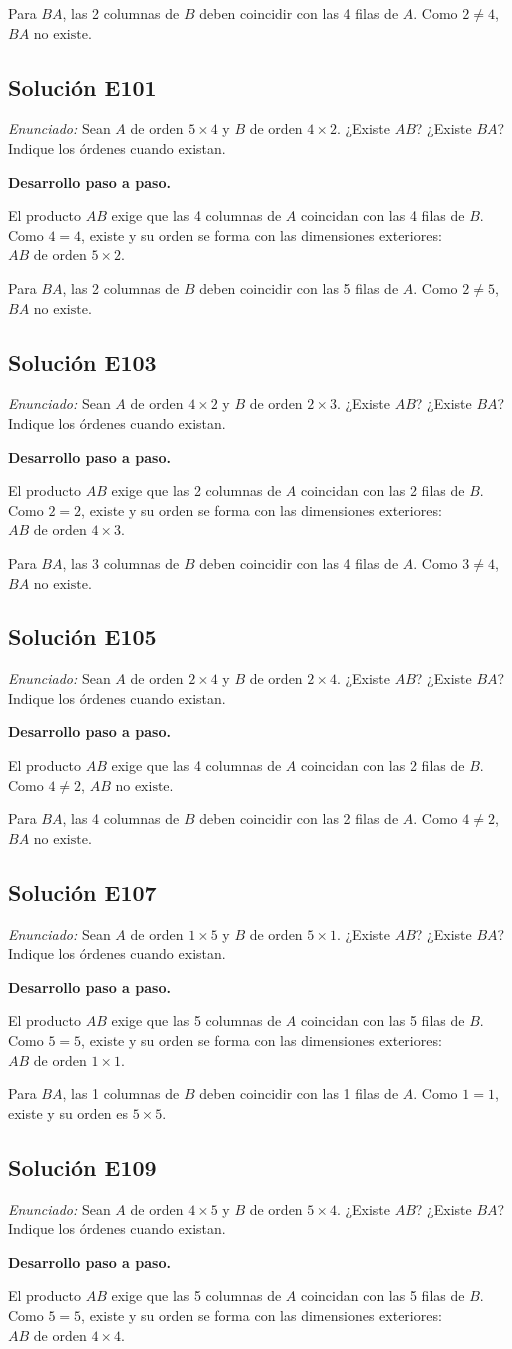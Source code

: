 \documentclass[12pt]{article}
\theoremstyle{remark}
\newcommand{\solucion}[2]{\Needspace{11\baselineskip}\subsection*{Solución E#1}\noindent\textit{Enunciado:} #2\par\medskip\noindent\textbf{Desarrollo paso a paso.}\par\medskip}
\begin{document}
Para $BA$, las 2 columnas de $B$ deben coincidir con las 4 filas de $A$. Como $2\neq4$, $\boxed{BA\text{ no existe}}$.


\medskip

\solucion{101}{Sean $A$ de orden $5\times4$ y $B$ de orden $4\times2$. ¿Existe $AB$? ¿Existe $BA$? Indique los órdenes cuando existan.}
El producto $AB$ exige que las 4 columnas de $A$ coincidan con las 4 filas de $B$. Como $4=4$, existe y su orden se forma con las dimensiones exteriores: $\boxed{AB\text{ de orden } 5\times 2}$.

Para $BA$, las 2 columnas de $B$ deben coincidir con las 5 filas de $A$. Como $2\neq5$, $\boxed{BA\text{ no existe}}$.


\medskip

\solucion{103}{Sean $A$ de orden $4\times2$ y $B$ de orden $2\times3$. ¿Existe $AB$? ¿Existe $BA$? Indique los órdenes cuando existan.}
El producto $AB$ exige que las 2 columnas de $A$ coincidan con las 2 filas de $B$. Como $2=2$, existe y su orden se forma con las dimensiones exteriores: $\boxed{AB\text{ de orden } 4\times 3}$.

Para $BA$, las 3 columnas de $B$ deben coincidir con las 4 filas de $A$. Como $3\neq4$, $\boxed{BA\text{ no existe}}$.


\medskip

\solucion{105}{Sean $A$ de orden $2\times4$ y $B$ de orden $2\times4$. ¿Existe $AB$? ¿Existe $BA$? Indique los órdenes cuando existan.}
El producto $AB$ exige que las 4 columnas de $A$ coincidan con las 2 filas de $B$. Como $4\neq2$, $\boxed{AB\text{ no existe}}$.

Para $BA$, las 4 columnas de $B$ deben coincidir con las 2 filas de $A$. Como $4\neq2$, $\boxed{BA\text{ no existe}}$.


\medskip

\solucion{107}{Sean $A$ de orden $1\times5$ y $B$ de orden $5\times1$. ¿Existe $AB$? ¿Existe $BA$? Indique los órdenes cuando existan.}
El producto $AB$ exige que las 5 columnas de $A$ coincidan con las 5 filas de $B$. Como $5=5$, existe y su orden se forma con las dimensiones exteriores: $\boxed{AB\text{ de orden } 1\times 1}$.

Para $BA$, las 1 columnas de $B$ deben coincidir con las 1 filas de $A$. Como $1=1$, existe y su orden es $\boxed{5\times 5}$.


\medskip

\solucion{109}{Sean $A$ de orden $4\times5$ y $B$ de orden $5\times4$. ¿Existe $AB$? ¿Existe $BA$? Indique los órdenes cuando existan.}
El producto $AB$ exige que las 5 columnas de $A$ coincidan con las 5 filas de $B$. Como $5=5$, existe y su orden se forma con las dimensiones exteriores: $\boxed{AB\text{ de orden } 4\times 4}$.
\end{document}
